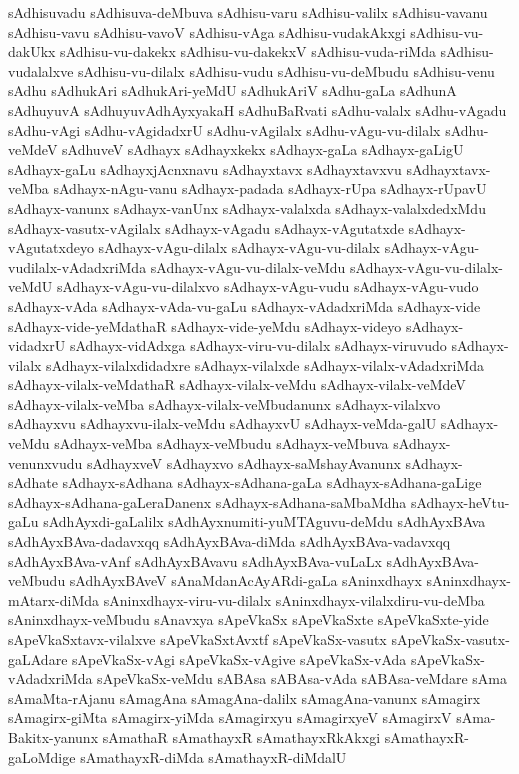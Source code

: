 {sAdhisuvadu
sAdhisuva-deMbuva
sAdhisu-varu
sAdhisu-valilx
sAdhisu-vavanu
sAdhisu-vavu
sAdhisu-vavoV
sAdhisu-vAga
sAdhisu-vudakAkxgi
sAdhisu-vu-dakUkx
sAdhisu-vu-dakekx
sAdhisu-vu-dakekxV
sAdhisu-vuda-riMda
sAdhisu-vudalalxve
sAdhisu-vu-dilalx
sAdhisu-vudu
sAdhisu-vu-deMbudu
sAdhisu-venu
sAdhu
sAdhukAri
sAdhukAri-yeMdU
sAdhukAriV
sAdhu-gaLa
sAdhunA
sAdhuyuvA
sAdhuyuvAdhAyxyakaH
sAdhuBaRvati
sAdhu-valalx
sAdhu-vAgadu
sAdhu-vAgi
sAdhu-vAgidadxrU
sAdhu-vAgilalx
sAdhu-vAgu-vu-dilalx
sAdhu-veMdeV
sAdhuveV
sAdhayx
sAdhayxkekx
sAdhayx-gaLa
sAdhayx-gaLigU
sAdhayx-gaLu
sAdhayxjAcnxnavu
sAdhayxtavx
sAdhayxtavxvu
sAdhayxtavx-veMba
sAdhayx-nAgu-vanu
sAdhayx-padada
sAdhayx-rUpa
sAdhayx-rUpavU
sAdhayx-vanunx
sAdhayx-vanUnx
sAdhayx-valalxda
sAdhayx-valalxdedxMdu
sAdhayx-vasutx-vAgilalx
sAdhayx-vAgadu
sAdhayx-vAgutatxde
sAdhayx-vAgutatxdeyo
sAdhayx-vAgu-dilalx
sAdhayx-vAgu-vu-dilalx
sAdhayx-vAgu-vudilalx-vAdadxriMda
sAdhayx-vAgu-vu-dilalx-veMdu
sAdhayx-vAgu-vu-dilalx-veMdU
sAdhayx-vAgu-vu-dilalxvo
sAdhayx-vAgu-vudu
sAdhayx-vAgu-vudo
sAdhayx-vAda
sAdhayx-vAda-vu-gaLu
sAdhayx-vAdadxriMda
sAdhayx-vide
sAdhayx-vide-yeMdathaR
sAdhayx-vide-yeMdu
sAdhayx-videyo
sAdhayx-vidadxrU
sAdhayx-vidAdxga
sAdhayx-viru-vu-dilalx
sAdhayx-viruvudo
sAdhayx-vilalx
sAdhayx-vilalxdidadxre
sAdhayx-vilalxde
sAdhayx-vilalx-vAdadxriMda
sAdhayx-vilalx-veMdathaR
sAdhayx-vilalx-veMdu
sAdhayx-vilalx-veMdeV
sAdhayx-vilalx-veMba
sAdhayx-vilalx-veMbudanunx
sAdhayx-vilalxvo
sAdhayxvu
sAdhayxvu-ilalx-veMdu
sAdhayxvU
sAdhayx-veMda-galU
sAdhayx-veMdu
sAdhayx-veMba
sAdhayx-veMbudu
sAdhayx-veMbuva
sAdhayx-venunxvudu
sAdhayxveV
sAdhayxvo
sAdhayx-saMshayAvanunx
sAdhayx-sAdhate
sAdhayx-sAdhana
sAdhayx-sAdhana-gaLa
sAdhayx-sAdhana-gaLige
sAdhayx-sAdhana-gaLeraDanenx
sAdhayx-sAdhana-saMbaMdha
sAdhayx-heVtu-gaLu
sAdhAyxdi-gaLalilx
sAdhAyxnumiti-yuMTAguvu-deMdu
sAdhAyxBAva
sAdhAyxBAva-dadavxqq
sAdhAyxBAva-diMda
sAdhAyxBAva-vadavxqq
sAdhAyxBAva-vAnf
sAdhAyxBAvavu
sAdhAyxBAva-vuLaLx
sAdhAyxBAva-veMbudu
sAdhAyxBAveV
sAnaMdanAcAyARdi-gaLa
sAninxdhayx
sAninxdhayx-mAtarx-diMda
sAninxdhayx-viru-vu-dilalx
sAninxdhayx-vilalxdiru-vu-deMba
sAninxdhayx-veMbudu
sAnavxya
sApeVkaSx
sApeVkaSxte
sApeVkaSxte-yide
sApeVkaSxtavx-vilalxve
sApeVkaSxtAvxtf
sApeVkaSx-vasutx
sApeVkaSx-vasutx-gaLAdare
sApeVkaSx-vAgi
sApeVkaSx-vAgive
sApeVkaSx-vAda
sApeVkaSx-vAdadxriMda
sApeVkaSx-veMdu
sABAsa
sABAsa-vAda
sABAsa-veMdare
sAma
sAmaMta-rAjanu
sAmagAna
sAmagAna-dalilx
sAmagAna-vanunx
sAmagirx
sAmagirx-giMta
sAmagirx-yiMda
sAmagirxyu
sAmagirxyeV
sAmagirxV
sAma-Bakitx-yanunx
sAmathaR
sAmathayxR
sAmathayxRkAkxgi
sAmathayxR-gaLoMdige
sAmathayxR-diMda
sAmathayxR-diMdalU
}
